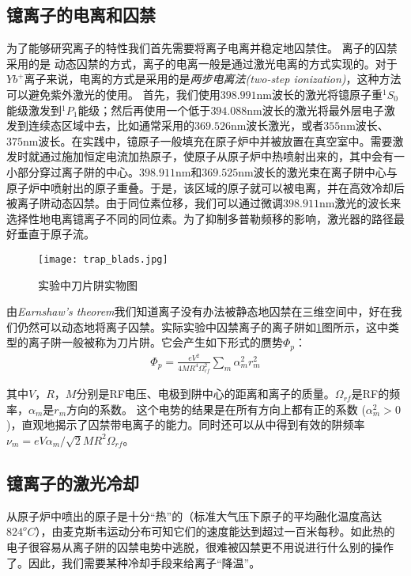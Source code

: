 \subsection[镱离子的电离和囚禁]{镱离子的电离和囚禁}
为了能够研究离子的特性我们首先需要将离子电离并稳定地囚禁住。
离子的囚禁采用的是
动态囚禁的方式，离子的电离一般是通过激光电离的方式实现的。对于$Yb^+$离子来说，电离的方式是采用的是\emph{两步电离法(two-step ionization)}\cite[]{Olmschenk_Younge_Moehring_Matsukevich_Maunz_Monroe_2007}，这种方法可以避免紫外激光的使用。
首先，我们使用$398.991$nm波长的激光将镱原子重$^1S_0$能级激发到$^1P_1$能级；然后再使用一个低于$394.088$nm波长的激光将最外层电子激发到连续态区域中去，比如通常采用的$369.526$nm波长激光，或者$355$nm波长、$375$nm波长。在实践中，镱原子一般填充在原子炉中并被放置在真空室中。需要激发时就通过施加恒定电流加热原子，使原子从原子炉中热喷射出来的，其中会有一小部分穿过离子阱的中心。$398.911$nm和$369.525$nm波长的激光束在离子阱中心与原子炉中喷射出的原子重叠。于是，该区域的原子就可以被电离，并在高效冷却后被离子阱动态囚禁。由于同位素位移，我们可以通过微调$398.911$nm激光的波长来选择性地电离镱离子不同的同位素。为了抑制多普勒频移的影响，激光器的路径最好垂直于原子流。

\begin{figure}
    \centering
    \caption[刀片阱实物图]{实验中刀片阱实物图\label{fig:trap_blads}}
    \texttt{[image: trap\_blads.jpg]}
\end{figure}

由\emph{Earnshaw's theorem}\cite[]{Earnshaw}我们知道离子没有办法被静态地囚禁在三维空间中，好在我们仍然可以动态地将离子囚禁。实际实验中囚禁离子的离子阱如\ref{fig:trap_blads}图所示，这中类型的离子阱一般被称为刀片阱。它会产生如下形式的赝势$\Phi_p$：
\begin{align}
    \Phi_p=\frac{eV^2}{4MR^4\Omega_{rf}^2}\sum_{m}^{}\alpha_m^2r_m^2
\end{align}

其中$V$，$R$，$M$分别是RF电压、电极到阱中心的距离和离子的质量。$\Omega_{rf}$是RF的频率，$\alpha_m$是$r_m$方向的系数。
这个电势的结果是在所有方向上都有正的系数 ($\alpha_m^2>0$)，直观地揭示了囚禁带电离子的能力。同时还可以从中得到有效的阱频率$\nu_m=eV\alpha_m/\sqrt{2}MR^2\Omega_{rf}$。

\subsection[镱离子的激光冷却]{镱离子的激光冷却\label{section:yb_laser_cooling}}
从原子炉中喷出的原子是十分“热”的（标准大气压下原子的平均融化温度高达$824 ^o C$），由麦克斯韦运动分布可知它们的速度能达到超过一百米每秒。如此热的电子很容易从离子阱的囚禁电势中逃脱，很难被囚禁更不用说进行什么别的操作了。因此，我们需要某种冷却手段来给离子“降温”。


